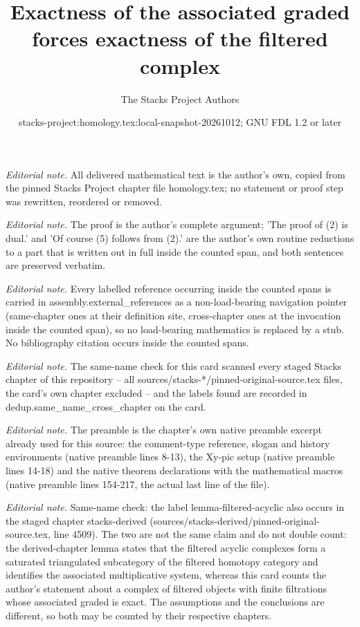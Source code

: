 \documentclass[10pt,a4paper]{amsart}
\title{Exactness of the associated graded forces exactness of the filtered complex}
\author{The Stacks Project Authors}
\date{stacks-project:homology.tex:local-snapshot-20261012; GNU FDL 1.2 or later}
\theoremstyle{plain}
\theoremstyle{definition}
\theoremstyle{remark}
\numberwithin{equation}{subsection}
\begin{document}
\maketitle
\noindent\textit{Editorial note.} All delivered mathematical text is the author's own, copied from the pinned Stacks Project chapter file homology.tex; no statement or proof step was rewritten, reordered or removed.\par\medskip
\noindent\textit{Editorial note.} The proof is the author's complete argument; 'The proof of (2) is dual.' and 'Of course (5) follows from (2).' are the author's own routine reductions to a part that is written out in full inside the counted span, and both sentences are preserved verbatim.\par\medskip
\noindent\textit{Editorial note.} Every labelled reference occurring inside the counted spans is carried in assembly.external\_references as a non-load-bearing navigation pointer (same-chapter ones at their definition site, cross-chapter ones at the invocation inside the counted span), so no load-bearing mathematics is replaced by a stub. No bibliography citation occurs inside the counted spans.\par\medskip
\noindent\textit{Editorial note.} The same-name check for this card scanned every staged Stacks chapter of this repository -- all sources/stacks-*/pinned-original-source.tex files, the card's own chapter excluded -- and the labels found are recorded in dedup.same\_name\_cross\_chapter on the card.\par\medskip
\noindent\textit{Editorial note.} The preamble is the chapter's own native preamble excerpt already used for this source: the comment-type reference, slogan and history environments (native preamble lines 8-13), the Xy-pic setup (native preamble lines 14-18) and the native theorem declarations with the mathematical macros (native preamble lines 154-217, the actual last line of the file).\par\medskip
\noindent\textit{Editorial note.} Same-name check: the label lemma-filtered-acyclic also occurs in the staged chapter stacks-derived (sources/stacks-derived/pinned-original-source.tex, line 4509). The two are not the same claim and do not double count: the derived-chapter lemma states that the filtered acyclic complexes form a saturated triangulated subcategory of the filtered homotopy category and identifies the associated multiplicative system, whereas this card counts the author's statement about a complex of filtered objects with finite filtrations whose associated graded is exact. The assumptions and the conclusions are different, so both may be counted by their respective chapters.\par\medskip
\end{document}
